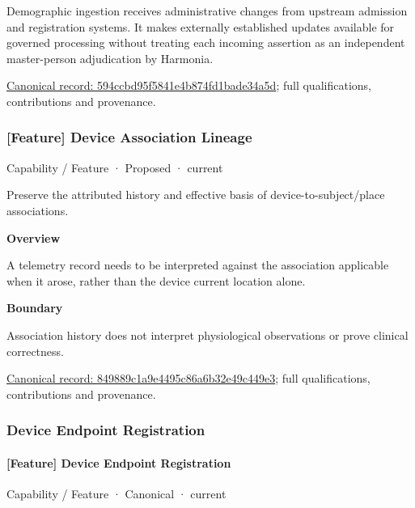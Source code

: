 Demographic ingestion receives administrative changes from upstream admission and registration systems. It makes externally established updates available for governed processing without treating each incoming assertion as an independent master-person adjudication by Harmonia.


{\footnotesize \href{../../../../continuum/strategy/capability/feature/594ccbd95f5841e4b874fd1bade34a5d.md}{Canonical record: 594ccbd95f5841e4b874fd1bade34a5d}; full qualifications, contributions and provenance.}\par
\subsubsection{[Feature] Device Association Lineage}

\label{element:849889c1a9e4495c86a6b32e49c449e3}
{\small Capability / Feature · Proposed · current}\par

Preserve the attributed history and effective basis of device-to-subject/place associations.



\textbf{Overview}



A telemetry record needs to be interpreted against the association applicable when it arose, rather than the device current location alone.



\textbf{Boundary}



Association history does not interpret physiological observations or prove clinical correctness.


{\footnotesize \href{../../../../continuum/strategy/capability/feature/849889c1a9e4495c86a6b32e49c449e3.md}{Canonical record: 849889c1a9e4495c86a6b32e49c449e3}; full qualifications, contributions and provenance.}\par
\subsubsection{Device Endpoint Registration}

\paragraph{[Feature] Device Endpoint Registration}

\label{element:d32c856559c54b41941fc51fbd019195}
{\small Capability / Feature · Canonical · current}\par

